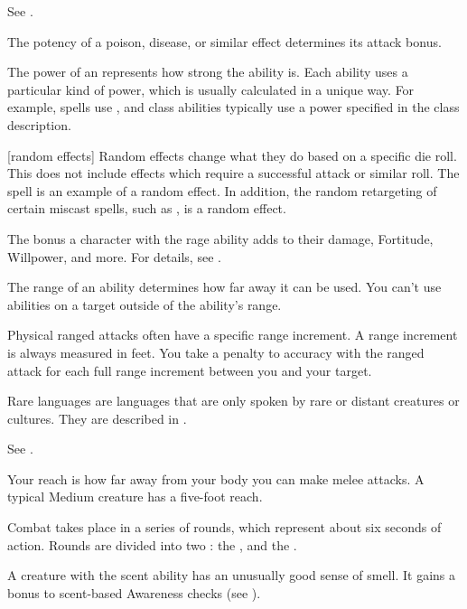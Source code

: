  See .

 The potency of a poison, disease, or similar effect determines its attack bonus.

 The power of an  represents how strong the ability is.
Each ability uses a particular kind of power, which is usually calculated in a unique way.
For example, spells use , and class abilities typically use a power specified in the class description.

[random effects] Random effects change what they do based on a specific die roll.
This does not include effects which require a successful attack or similar roll.
The  spell is an example of a random effect.
In addition, the random retargeting of certain miscast spells, such as , is a random effect.

 The bonus a character with the rage ability adds to their damage, Fortitude, Willpower, and more.
For details, see .

 The range of an ability determines how far away it can be used.
You can't use abilities on a target outside of the ability's range.

 Physical ranged attacks often have a specific range increment.
A range increment is always measured in feet.
You take a  penalty to accuracy with the ranged attack for each full range increment between you and your target.

 Rare languages are languages that are only spoken by rare or distant creatures or cultures.
They are described in .

 See .

 Your reach is how far away from your body you can make melee attacks.
A typical Medium creature has a five-foot reach.

 Combat takes place in a series of rounds, which represent about six seconds of action.
Rounds are divided into two : the , and the .

 A creature with the scent ability has an unusually good sense of smell.
It gains a  bonus to scent-based Awareness checks (see ).

